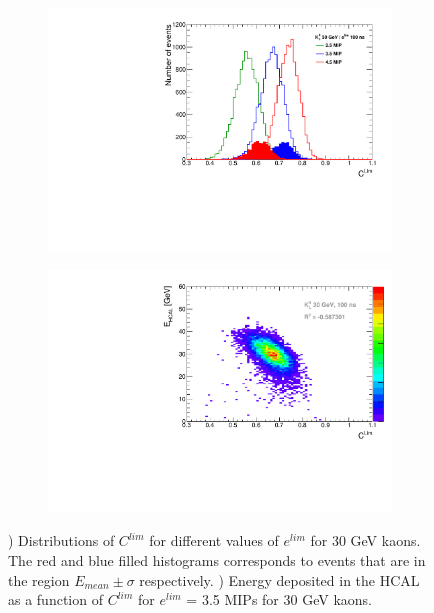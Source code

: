 \begin{figure}[htbp!]
  \centering
  \begin{subfigure}[t]{0.49\textwidth}
    \centering
    \includegraphics[width=1\linewidth]{../Thesis_Plots/ILD/AdditionalPlots/Plots/CLim_100ns_30GeV.pdf}
    \caption{} \label{fig:CLim30_100ns}
  \end{subfigure}
  \hfill
  \begin{subfigure}[t]{0.49\textwidth}
    \centering
    \includegraphics[width=1\linewidth]{../Thesis_Plots/ILD/AdditionalPlots/Plots/EhcalCLim_100ns_30GeV.pdf}
    \caption{} \label{fig:EhcalCLim30_100ns}
  \end{subfigure}
  \caption{) Distributions of $C^{lim}$ for different values of $e^{lim}$ for 30 GeV kaons. The red and blue filled histograms corresponds to events that are in the region $E_{mean} \pm \sigma$ respectively. ) Energy deposited in the HCAL as a function of $C^{lim}$ for $e^{lim}$ = 3.5 MIPs for 30 GeV kaons.}
\end{figure}

